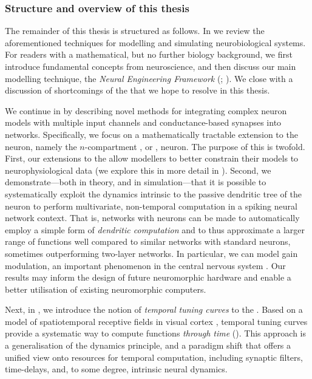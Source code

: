 \subsubsection{Structure and overview of this thesis}

The remainder of this thesis is structured as follows.
In  we review the aforementioned techniques for modelling and simulating neurobiological systems.
For readers with a mathematical, but no further biology background, we first introduce fundamental concepts from neuroscience, and then discuss our main modelling technique, the \emph{Neural Engineering Framework} (\NEF; \cite{eliasmith2003neural}).
We close with a discussion of shortcomings of the \NEF that we hope to resolve in this thesis.

We continue in  by describing novel methods for integrating complex neuron models with multiple input channels and conductance-based synapses into \NEF networks.
Specifically, we focus on a mathematically tractable extension to the \LIF neuron, namely the $n$-compartment \LIF, or \nlif, neuron.
The purpose of this is twofold.
First, our extensions to the \NEF allow modellers to better constrain their models to neurophysiological data (we explore this in more detail in ).
Second, we demonstrate---both in theory, and in simulation---that it is possible to systematically exploit the dynamics intrinsic to the passive dendritic tree of the \nlif neuron to perform multivariate, non-temporal computation in a spiking neural network context.
That is, \NEF networks with \nlif neurons can be made to automatically employ a simple form of \emph{dendritic computation} \citep{mel1994information,london2005dendritic} and to thus approximate a larger range of functions well compared to similar networks with standard \LIF neurons, sometimes outperforming two-layer networks.
In particular, we can model gain modulation, an important phenomenon in the central nervous system \citep{salinas2000gain,chance2002gain}.
Our results may inform the design of future neuromorphic hardware and enable a better utilisation of existing neuromorphic computers.

Next, in , we introduce the notion of \emph{temporal tuning curves} to the \NEF.
Based on a model of spatiotemporal receptive fields in visual cortex \citep{carandini1999linearity}, temporal tuning curves provide a systematic way to compute functions \emph{through time} ().
This approach is a generalisation of the \NEF dynamics principle, and a paradigm shift that offers a unified view onto resources for temporal computation, including synaptic filters, time-delays, and, to some degree, intrinsic neural dynamics.

